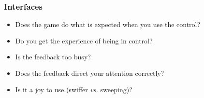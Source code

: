 \documentclass{beamer}
\begin{document}
\begin{frame}
  \frametitle{Interfaces}

\begin{itemize}
\item Does the game do what is expected when you use the control?
\item Do you get the experience of being in control?
\item Is the feedback too busy?
\item Does the feedback direct your attention correctly?
\item Is it a joy to use (swiffer {\em vs.} sweeping)?
\end{itemize}

\end{frame}
\end{document}
